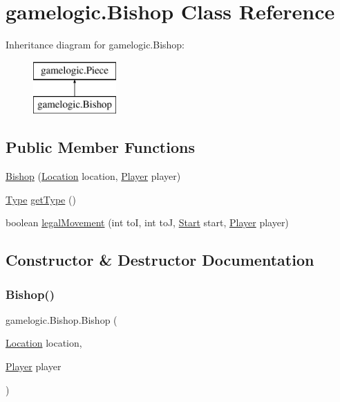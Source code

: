 \hypertarget{classgamelogic_1_1_bishop}{}\section{gamelogic.\+Bishop Class Reference}
\label{classgamelogic_1_1_bishop}
Inheritance diagram for gamelogic.\+Bishop\+:\begin{figure}[H]
\begin{center}
\leavevmode
\includegraphics[height=2.000000cm]{classgamelogic_1_1_bishop}
\end{center}
\end{figure}
\subsection*{Public Member Functions}
\begin{DoxyCompactItemize}
\item 
\mbox{\hyperlink{classgamelogic_1_1_bishop_a8012110b6173a72ab217fd1ed14ae71f}{Bishop}} (\mbox{\hyperlink{classgamelogic_1_1_location}{Location}} location, \mbox{\hyperlink{classgamelogic_1_1_player}{Player}} player)
\item 
\mbox{\hyperlink{enumgamelogic_1_1_type}{Type}} \mbox{\hyperlink{classgamelogic_1_1_bishop_a635d8c99a57a092417e0745918217427}{get\+Type}} ()
\item 
boolean \mbox{\hyperlink{classgamelogic_1_1_bishop_a56bffbbf10a9864c982ab2f9142724ce}{legal\+Movement}} (int toI, int toJ, \mbox{\hyperlink{classgamelogic_1_1_start}{Start}} start, \mbox{\hyperlink{classgamelogic_1_1_player}{Player}} player)
\end{DoxyCompactItemize}


\subsection{Constructor \& Destructor Documentation}
\mbox{\label{classgamelogic_1_1_bishop_a8012110b6173a72ab217fd1ed14ae71f}} 
\subsubsection{\texorpdfstring{Bishop()}{Bishop()}}
{\footnotesize\ttfamily gamelogic.\+Bishop.\+Bishop (\begin{DoxyParamCaption}\item[{\mbox{\hyperlink{classgamelogic_1_1_location}{Location}}}]{location,  }\item[{\mbox{\hyperlink{classgamelogic_1_1_player}{Player}}}]{player }\end{DoxyParamCaption})}


